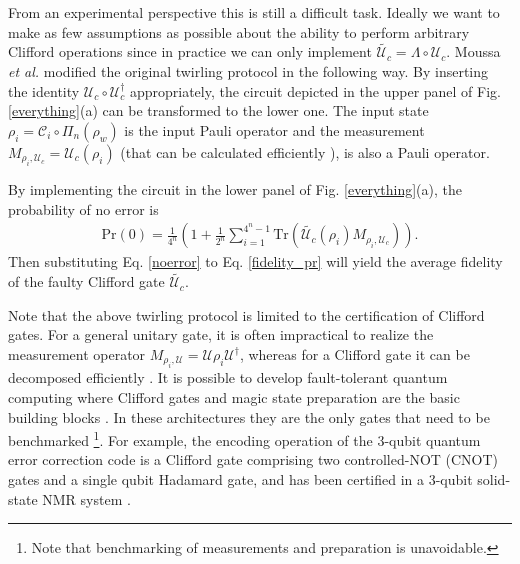 \documentclass[prl,twocolumn,showpacs]{revtex4-1}
\newcommand{\R}[1]{{\color{red}#1}}
\begin{document}
From an experimental perspective this is still a difficult task. Ideally we want to make as few assumptions as possible about the ability to perform arbitrary Clifford operations since in practice  we can only implement $\tilde{\mathcal{U}_c} =\Lambda\circ \mathcal{U}_c$.  Moussa \emph{et al.}  \cite{Moussa2012} modified the  original twirling protocol in the following way.  By inserting the identity $\mathcal{U}_c \circ \mathcal{U}_c^\dagger$ appropriately, the circuit depicted in the upper panel of Fig. \ref{everything}(a) can be transformed to the lower one.   The input state $\rho_{i} = \mathcal{C}_i \circ \Pi_n( \rho_{w})$ is the input Pauli operator %
 and the measurement $M_{\rho_i, \mathcal{U}_c} = \mathcal{U}_c( \rho_{i})$ (that can be calculated efficiently \cite{Aaronson2004}),
is also a Pauli operator.

By implementing the circuit in the lower panel of Fig. \ref{everything}(a), the probability of no error is \cite{Alex2013} %
\begin{align} \label{noerror}
\text{Pr}(0) = \frac{1}{4^n} \left( 1+ \frac{1}{2^n}\sum_{i=1}^{4^n-1} \text{Tr}\left( \tilde{\mathcal{U}_c} \left( \rho_{i}\right) M_{\rho_i, \mathcal{U}_c}\right)\right).
\end{align}
Then substituting Eq. \eqref{noerror} to Eq. \eqref{fidelity_pr} will yield the average fidelity of the faulty Clifford gate $\tilde{\mathcal{U}_c}$.

Note that the above twirling protocol is limited to the certification of Clifford gates. For a general unitary gate, it is often impractical to realize the measurement operator $M_{\rho_i, \mathcal{U}} = \mathcal{U} \rho_{i} \mathcal{U}^{\dagger}$, whereas for a Clifford gate it can be decomposed  efficiently \cite{Aaronson2004}. It is possible to develop fault-tolerant  quantum computing where Clifford gates and  magic state preparation are the basic building blocks \cite{Bravyi2005,Souza2011}. In  these architectures   they are the only gates that need to be benchmarked \footnote{Note that benchmarking of measurements and preparation is unavoidable.}. For example, the encoding operation of the 3-qubit quantum error correction code is a Clifford gate comprising two controlled-NOT (CNOT) gates and a single qubit Hadamard gate, and has been certified in a 3-qubit solid-state NMR system \cite{Moussa2012}.
\end{document}

